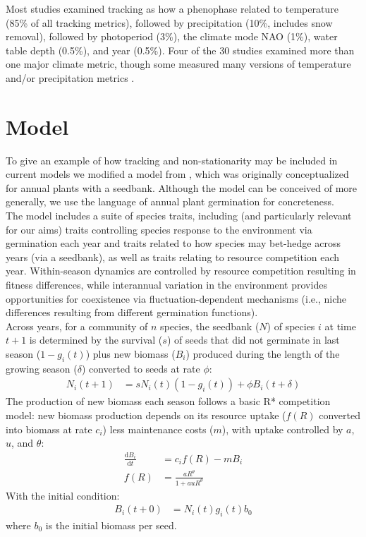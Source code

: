 \documentclass[11pt,letter]{article}
\begin{document}
Most studies examined tracking as how a phenophase related to temperature (85\% of all tracking metrics), followed by precipitation (10\%, includes snow removal), followed by photoperiod (3\%), the climate mode NAO (1\%), water table depth (0.5\%), and year (0.5\%). Four of the 30 studies examined more than one major climate metric, though some measured many versions of temperature and/or precipitation metrics \citep[e.g., 15 precipitation and/or temperature metrics considered in][]{munson2017}.


\newpage 
\clearpage
\section{Model} 
To give an example of how tracking and non-stationarity may be included in current models we modified a model from \citet{Chesson:2004eo}, which was originally conceptualized for annual plants with a seedbank.  Although the model can be conceived of more generally, we use the language of annual plant germination for concreteness. \\

The model includes a suite of species traits, including (and particularly relevant for our aims) traits controlling species response to the environment via germination each year and traits related to how species may bet-hedge across years (via a seedbank), as well as traits relating to resource competition each year. Within-season dynamics are controlled by resource competition resulting in fitness differences, while interannual variation in the environment provides opportunities for coexistence via fluctuation-dependent mechanisms (i.e., niche differences resulting from different germination functions). \\

Across years, for a community of \(n\) species, the seedbank ($N$) of species $i$ at time $t+1$ is determined by the survival ($s$) of seeds that did not germinate in last season ($1-g_{i}(t)$) plus new biomass ($B_i$) produced during the length of the growing season ($\delta$) converted to seeds at rate $\phi$:
\begin{align}
N_{i}(t+1) & =
s N_{i}(t)(1-g_{i}(t))+\phi B_{i}(t+\delta)
\end{align}
The production of new biomass each season follows a basic R* competition model: new biomass production depends on its resource uptake ($f(R)$ converted into biomass at rate $c_i$) less maintenance costs ($m$), with uptake controlled by $a$, $u$, and $\theta$:
\begin{align}
\frac{\mathrm{d}B_i}{\mathrm{d}t} & = c_{i}f(R) - m B_{i} \\
f(R) & = \frac{a R^{\theta}}{1+a uR^{\theta}}
\end{align}
With the initial condition:
\begin{align}
B_{i}(t+0) & = N_{i}(t)g_{i}(t)b_{0}
\end{align}
where $b_{0}$ is the initial biomass per seed.\\
\end{document}
